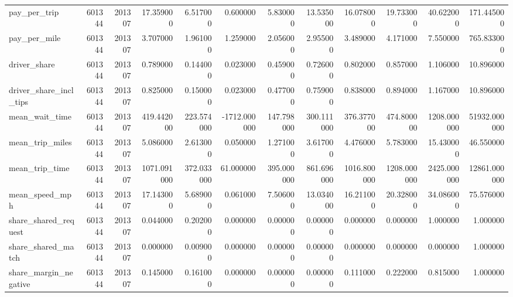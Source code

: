 \begin{longtable}{lrrrrrrrrrrr}
pay_per_trip & 601344 & 201307 & 17.359000 & 6.517000 & 0.600000 & 5.830000 & 13.535000 & 16.078000 & 19.733000 & 40.622000 & 171.445000 \\
pay_per_mile & 601344 & 201307 & 3.707000 & 1.961000 & 1.259000 & 2.056000 & 2.955000 & 3.489000 & 4.171000 & 7.550000 & 765.833000 \\
driver_share & 601344 & 201307 & 0.789000 & 0.144000 & 0.023000 & 0.459000 & 0.726000 & 0.802000 & 0.857000 & 1.106000 & 10.896000 \\
driver_share_incl_tips & 601344 & 201307 & 0.825000 & 0.150000 & 0.023000 & 0.477000 & 0.759000 & 0.838000 & 0.894000 & 1.167000 & 10.896000 \\
mean_wait_time & 601344 & 201307 & 419.442000 & 223.574000 & -1712.000000 & 147.798000 & 300.111000 & 376.377000 & 474.800000 & 1208.000000 & 51932.000000 \\
mean_trip_miles & 601344 & 201307 & 5.086000 & 2.613000 & 0.050000 & 1.271000 & 3.617000 & 4.476000 & 5.783000 & 15.430000 & 46.550000 \\
mean_trip_time & 601344 & 201307 & 1071.091000 & 372.033000 & 61.000000 & 395.000000 & 861.696000 & 1016.800000 & 1208.000000 & 2425.000000 & 12861.000000 \\
mean_speed_mph & 601344 & 201307 & 17.143000 & 5.689000 & 0.061000 & 7.506000 & 13.034000 & 16.211000 & 20.328000 & 34.086000 & 75.576000 \\
share_shared_request & 601344 & 201307 & 0.044000 & 0.202000 & 0.000000 & 0.000000 & 0.000000 & 0.000000 & 0.000000 & 1.000000 & 1.000000 \\
share_shared_match & 601344 & 201307 & 0.000000 & 0.009000 & 0.000000 & 0.000000 & 0.000000 & 0.000000 & 0.000000 & 0.000000 & 1.000000 \\
share_margin_negative & 601344 & 201307 & 0.145000 & 0.161000 & 0.000000 & 0.000000 & 0.000000 & 0.111000 & 0.222000 & 0.815000 & 1.000000 \\
\end{longtable}
